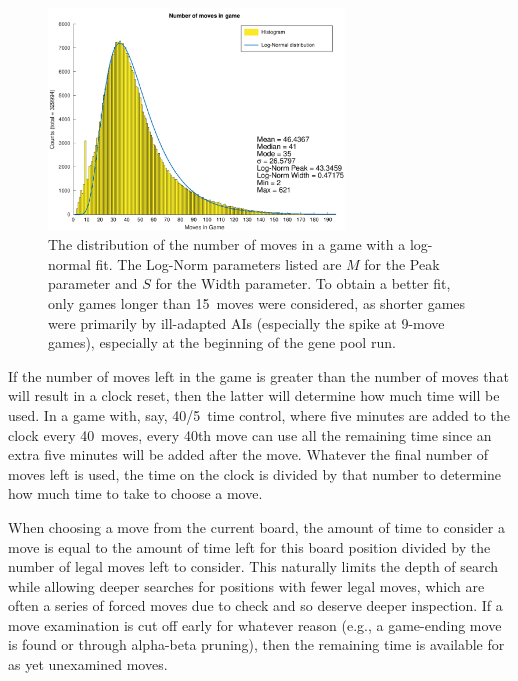 \documentclass[letterpaper]{article}
\renewcommand{\_}{\allowbreak\textunderscore\allowbreak}
\begin{document}
\begin{figure}[tbh]
	\centering
	\includegraphics[width=0.7\textwidth]{game_length_log_norm_distribution.png}
	\caption{The distribution of the number of moves in a game with a log-normal fit. The Log-Norm parameters listed are \(M\) for the Peak parameter and \(S\) for the Width parameter. To obtain a better fit, only games longer than 15~moves were considered, as shorter games were primarily by ill-adapted AIs (especially the spike at 9-move games), especially at the beginning of the gene pool run.}\label{log-norm-plot}
\end{figure}

If the number of moves left in the game is greater than the number of moves that will result in a clock reset, then the latter will determine how much time will be used. In a game with, say, 40/5~time control, where five minutes are added to the clock every 40~moves, every 40th move can use all the remaining time since an extra five minutes will be added after the move. Whatever the final number of moves left is used, the time on the clock is divided by that number to determine how much time to take to choose a move.

When choosing a move from the current board, the amount of time to consider a move is equal to the amount of time left for this board position divided by the number of legal moves left to consider. This naturally limits the depth of search while allowing deeper searches for positions with fewer legal moves, which are often a series of forced moves due to check and so deserve deeper inspection. If a move examination is cut off early for whatever reason (e.g., a game-ending move is found or through alpha-beta pruning), then the remaining time is available for as yet unexamined moves.
\end{document}

